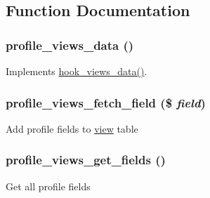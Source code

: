 \subsection{Function Documentation}
\hypertarget{profile_8views_8inc_aa426eb57d5065555896e709b6f109c30}{
\subsubsection[{profile\_\-views\_\-data}]{\setlength{\rightskip}{0pt plus 5cm}profile\_\-views\_\-data ()}}
\label{profile_8views_8inc_aa426eb57d5065555896e709b6f109c30}
Implements \hyperlink{group__views__hooks_ga227057901681e4a33e33c199c7a8c989}{hook\_\-views\_\-data()}. \hypertarget{profile_8views_8inc_ac5cda8db9f492d20dcbf2054cd1b0ad4}{
\subsubsection[{profile\_\-views\_\-fetch\_\-field}]{\setlength{\rightskip}{0pt plus 5cm}profile\_\-views\_\-fetch\_\-field (\$ {\em field})}}
\label{profile_8views_8inc_ac5cda8db9f492d20dcbf2054cd1b0ad4}
Add profile fields to \hyperlink{classview}{view} table \hypertarget{profile_8views_8inc_a8bf1ee086c336dadb69e8fe8728f17f0}{
\subsubsection[{profile\_\-views\_\-get\_\-fields}]{\setlength{\rightskip}{0pt plus 5cm}profile\_\-views\_\-get\_\-fields ()}}
\label{profile_8views_8inc_a8bf1ee086c336dadb69e8fe8728f17f0}
Get all profile fields 